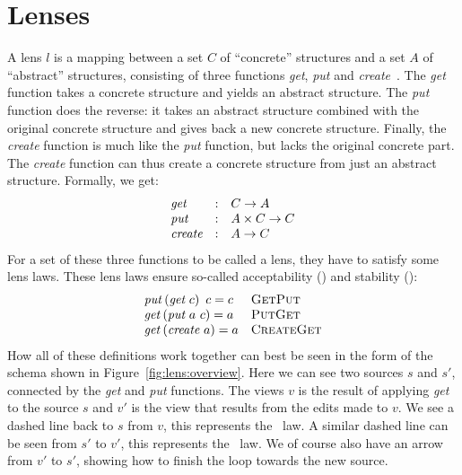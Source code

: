 \section{Lenses}\label{sec:background:lenses}
A lens \(l\) is a mapping between a set \(C\) of ``concrete''
structures and a set \(A\) of ``abstract'' structures, consisting of
three functions \emph{get}, \emph{put} and \emph{create}~\cite{foster2007}. The \emph{get}
function takes a concrete structure and yields an abstract structure. The
\emph{put} function does the reverse: it takes an abstract structure combined
with the original concrete structure and gives back a new concrete structure.
Finally, the \emph{create} function is much like the \emph{put} function, but
lacks the original concrete part. The \emph{create} function can thus create
a concrete structure from just an abstract structure. Formally, we get:
\[
  \begin{array}{lll}
    \textit{get} & : & C \rightarrow A \\
    \textit{put} & : & A \times C \rightarrow C \\
    \textit{create} & : & A \rightarrow C
  \end{array}
\]
For a set of these three functions to be called a lens, they have to satisfy some
lens laws. These lens laws ensure so-called acceptability (\putget)
and stability (\getput):
\[
  \begin{array}{ll}
    \mathit{put}\left(\textit{get}~c\right)~c = c & \textsc{GetPut} \\
    \mathit{get}\left(\textit{put}~a~c\right) = a & \textsc{PutGet} \\
    \mathit{get}\left(\textit{create}~a\right) = a & \textsc{CreateGet}
  \end{array}
\]
How all of these definitions work together can best be seen in the form of
the schema shown in Figure~\ref{fig:lens:overview}. Here we can see two
sources $s$ and $s'$, connected by the \emph{get} and \emph{put} functions.
The views $v$ is the result of applying \emph{get} to the source $s$ and $v'$
is the view that results from the edits made to $v$. We see a dashed line back
to $s$ from $v$, this represents the \getput~law. A similar dashed line can be
seen from $s'$ to $v'$, this represents the \putget~law. We of course also have
an arrow from $v'$ to $s'$, showing how to finish the loop towards the new
source.

